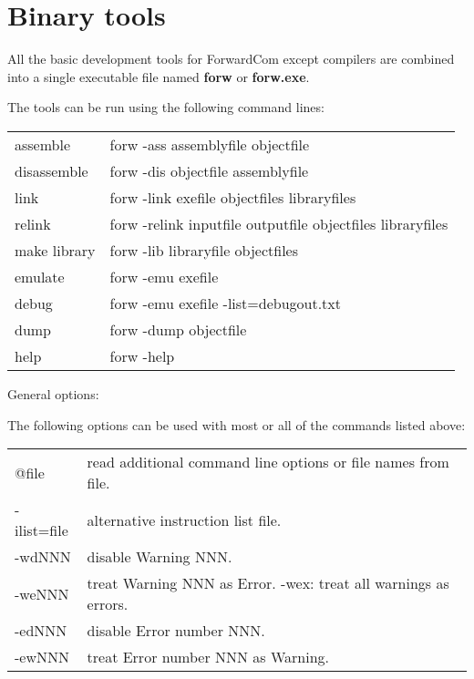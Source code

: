 \documentclass[forwardcom.tex]{subfiles}
\begin{document}
\RaggedRight
\lstset{language=C}            %
\lstset{basicstyle=\ttfamily,breaklines=true}


\chapter{Binary tools} \label{chap:binTools}
All the basic development tools for ForwardCom except compilers are combined into a single executable file named \textbf{forw} or \textbf{forw.exe}.
\vv

The tools can be run using the following command lines:
\vv

\label{bintoolCommands}
\begin{tabular}{ll}
\hline
assemble & forw -ass assemblyfile objectfile \\ 
disassemble & forw -dis objectfile assemblyfile \\ 
link & forw -link exefile objectfiles libraryfiles \\ 
relink & forw -relink inputfile outputfile objectfiles libraryfiles \\ 
make library & forw -lib libraryfile objectfiles \\
emulate & forw -emu exefile \\
debug & forw -emu exefile  -list=debugout.txt \\
dump & forw -dump objectfile \\ 
help & forw -help \\ 
\hline
\end{tabular}
\vspace{4mm}

General options:

The following options can be used with most or all of the commands listed above:

\begin{tabular}{p{20mm}p{140mm}}
\hline
@file & read additional command line options or file names from file.\\
-ilist=file & alternative instruction list file.\\
-wdNNN & disable Warning NNN.\\
-weNNN & treat Warning NNN as Error. -wex: treat all warnings as errors.\\
-edNNN & disable Error number NNN.\\
-ewNNN & treat Error number NNN as Warning.\\
\hline
\end{tabular}
\vv
\end{document}
